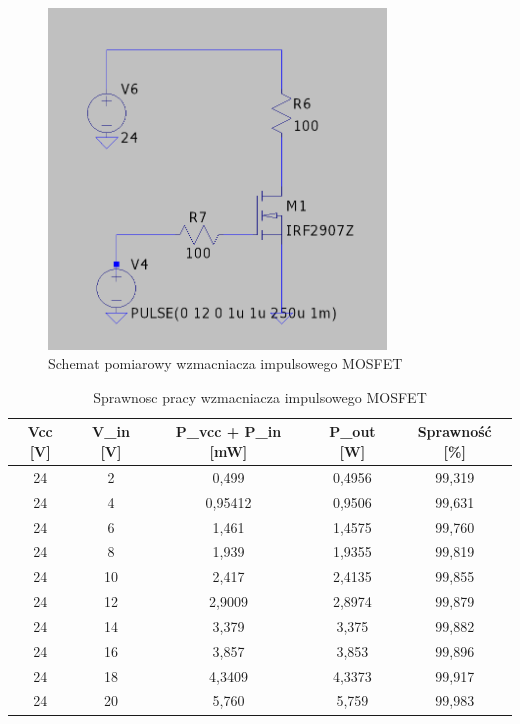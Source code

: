 \documentclass[11pt]{article}
\begin{document}
\begin{figure}[H]
\centering
\includegraphics[width=0.8\textwidth]{aun1_impulsowy_mosfet.png}
\caption{Schemat pomiarowy wzmacniacza impulsowego MOSFET}
\end{figure}

\begin{table}[H]
\centering
\begin{tabular}{|c|c|c|c|c|}
\hline
\textbf{Vcc [V]} & \textbf{V\_in [V]} & \textbf{P\_vcc + P\_in [mW]} & \textbf{P\_out [W]} & \textbf{Sprawność [\%]} \\
\hline
24 & 2  & 0{,}499    & 0{,}4956   & 99{,}319 \\
\hline
24 & 4  & 0{,}95412  & 0{,}9506   & 99{,}631 \\
\hline
24 & 6  & 1{,}461    & 1{,}4575   & 99{,}760 \\
\hline
24 & 8  & 1{,}939    & 1{,}9355   & 99{,}819 \\
\hline
24 & 10 & 2{,}417    & 2{,}4135   & 99{,}855 \\
\hline
24 & 12 & 2{,}9009   & 2{,}8974   & 99{,}879 \\
\hline
24 & 14 & 3{,}379    & 3{,}375    & 99{,}882 \\
\hline
24 & 16 & 3{,}857    & 3{,}853    & 99{,}896 \\
\hline
24 & 18 & 4{,}3409   & 4{,}3373   & 99{,}917 \\
\hline
24 & 20 & 5{,}760    & 5{,}759    & 99{,}983 \\
\hline
\end{tabular}
\caption{Sprawnosc pracy wzmacniacza impulsowego MOSFET}
\end{table}
\end{document}
